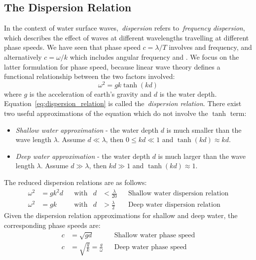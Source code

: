 \subsection{The Dispersion Relation}
\label{sec:dispersion_relation}

In the context of water surface waves,~\emph{dispersion} refers to~\emph{frequency dispersion}, which describes
the effect of waves at different wavelengths travelling at different phase speeds. We have seen that
phase speed $c = \lambda/T$ involves \wavelength and frequency, and alternatively $c = \omega/k$
which includes angular frequency and \wavenumber. We focus on the latter formulation for phase speed, because
linear wave theory defines a functional relationship between the two factors involved:
\begin{equation}
\label{eq:dispersion_relation}
 \omega^2 = gk\tanh(kd)
\end{equation}
%
where $g$ is the acceleration of earth's gravity and $d$ is the water depth. Equation~\ref{eq:dispersion_relation}
is called the~\emph{dispersion relation}.
There exist two useful approximations of the equation which do not involve the $\tanh$ term:
\begin{itemize}
 \item \emph{Shallow water approximation} - the water depth $d$ is much smaller than the wave length $\lambda$.
 Assume $d \ll \lambda$, then $0 \leq kd \ll 1$ and $\tanh(kd) \approx kd$.
 \item \emph{Deep water approximation} - the water depth $d$ is much larger than the wave length $\lambda$.
 Assume $d \gg \lambda$, then $kd \gg 1$ and $\tanh(kd) \approx 1$.
\end{itemize}
%
The reduced dispersion relations are as follows:
\begin{align*}
\omega^2 & = gk^2d && \text{with} & d &< \frac{\lambda}{20}  && \text{Shallow 
water dispersion relation}\\
\omega^2 & = gk    && \text{with} & d &> \frac{\lambda}{2} && \text{Deep water 
dispersion relation}
\end{align*}
%
Given the dispersion relation approximations for shallow and deep water, the corresponding
phase speeds are:
\begin{align}
 \label{eq:phase_speed_shallow_water} c &= \sqrt{gd} && \text{Shallow water phase speed}\\
  \label{eq:phase_speed_deep_water}   c &= \sqrt{\frac{g}{k}} = \frac{g}{\omega} && \text{Deep water phase speed}
\end{align}
